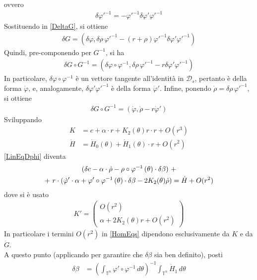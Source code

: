 \documentclass[twoside, 11pt]{amsbook}
\makeatletter
\newcommand{\0}{{(0)}}
\newcommand{\3}{{(3)}}
\theoremstyle{colonplain}
\theoremstyle{colondefinition}
\theoremstyle{colonremark}
\numberwithin{equation}{chapter}
\renewcommand{\proofname}{Dimostrazione}
\renewenvironment{proof}[1][\proofname]{\par
  \pushQED{\qed}%
  \normalfont \topsep6\p@\@plus6\p@\relax
  \trivlist
  \item[\hskip\labelsep\bfseries #1:]\ignorespaces
}{%
  \popQED\endtrivlist\@endpefalse
}
\makeatother
\begin{document}
\begin{proof}
ovvero
\begin{align}
    \delta\varphi'^{-1} = -\varphi'^{-1}\delta\varphi'\varphi'^{-1}
\end{align}
Sostituendo in \eqref{DeltaG}, si ottiene
\begin{align}
    \delta G = (\delta\varphi, \delta\rho \, \varphi'^{-1} - (r + \rho)\varphi'^{-1}\delta\varphi'\varphi'^{-1})
\end{align}
Quindi, pre-componendo per $G^{-1}$, si ha
\begin{align}
    \delta G \circ G^{-1} = (\delta \varphi \circ \varphi^{-1}, \delta\rho \, \varphi'^{-1} - r\delta\varphi'\varphi'^{-1})
\end{align}
In particolare, $\delta\varphi \circ \varphi^{-1}$ è un vettore tangente all'identità in $\mathcal{D}_s$, pertanto è della forma $\dot{\varphi}$, e, analogamente, $\delta\varphi'\varphi'^{-1}$ è della forma $\dot{\varphi}'$. Infine, ponendo $\dot{\rho} = \delta \rho \, \varphi'^{-1}$, si ottiene
\begin{align}
    \delta G \circ G^{-1} = (\dot{\varphi}, \dot{\rho} - r\dot{\varphi}')
\end{align}
Sviluppando
\begin{align}
    K &= c + \alpha \cdot r + K_2(\theta)r \cdot r + O(r^3) \\
    \dot{H} &= \dot{H}_0(\theta) + \dot{H}_1(\theta) \cdot r + O(r^2)
\end{align}
\eqref{LinEqDphi} diventa
\begin{gather}
    (\delta c - \alpha \cdot \dot{\rho} - \rho \circ \varphi^{-1} \, (\theta) \cdot \delta\beta) \ + \notag \\
    \label{HomEqs}
    + \ r \cdot (\dot{\varphi}' \cdot \alpha + \varphi' \circ \varphi^{-1} \, (\theta) \cdot \delta\beta - 2K_2(\theta)\dot{\rho}) = \dot{H} + O(r^2)
\end{gather}
dove si è usato
\begin{align}
    K' = \begin{pmatrix}
        O(r^2) \\
        \alpha + 2K_2(\theta)r + O(r^2)
    \end{pmatrix}
\end{align}
In particolare i termini $O(r^2)$ in \eqref{HomEqs} dipendono esclusivamente da $K$ e da $\dot{G}$. \\ 
A questo punto (applicando \cite[Proposizione~24]{Fejoz02} per garantire che $\delta\beta$ sia ben definito), posti
\begin{align}
    \delta\beta &= \left(\int_{\mathbb{T}^n} \varphi' \circ \varphi^{-1} \, d\theta\right)^{-1}\int_{\mathbb{T}^n} \dot{H}_1 \, d\theta \\

\end{align}
\end{proof}
\end{document}
